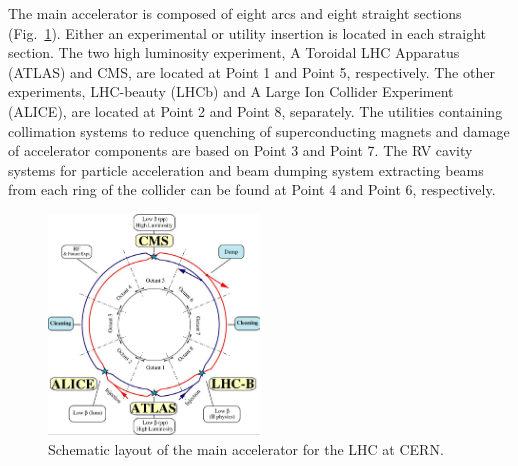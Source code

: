 The main accelerator is composed of eight arcs and eight straight sections (Fig.~\ref{fig:lhc_arc}).
Either an experimental or utility insertion is located in each straight section.
The two high luminosity experiment, A Toroidal LHC Apparatus (ATLAS) and CMS, are located at Point 1 and Point 5, respectively.
The other experiments, LHC-beauty (LHCb) and  A Large Ion Collider Experiment (ALICE), are located at Point 2 and Point 8, separately.
The utilities containing collimation systems to reduce quenching of superconducting magnets and damage of accelerator components are based on Point 3 and Point 7.
The RV cavity systems for particle acceleration and beam dumping system extracting beams from each ring of the collider can be found at Point 4 and Point 6, respectively.
\begin{figure}\centering
    \includegraphics[width=0.5\textwidth]{figure/lhc_arc.png}
    \caption{Schematic layout of the main accelerator for the LHC at CERN.}
    \label{fig:lhc_arc}
\end{figure}

